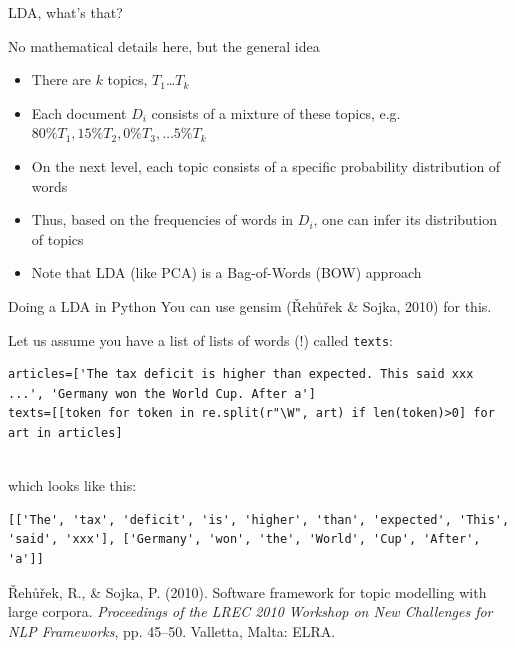 \documentclass[compress]{beamer}
\begin{document}
\begin{frame}{LDA, what's that?}
	\begin{block}{No mathematical details here, but the general idea}
		\begin{itemize}
			\item There are $k$ topics, $T_1$\ldots$T_k$
			\item Each document $D_i$ consists of a mixture of these topics, e.g.$80\% T_1, 15\% T_2, 0\% T_3, \ldots 5\% T_k $
			\item On the next level, each topic consists of a specific probability distribution of words
			\item Thus, based on the frequencies of words in $D_i$, one can infer its distribution of topics
			\item Note that LDA (like PCA) is a Bag-of-Words (BOW) approach
		\end{itemize}
	\end{block}
	
\end{frame}




\begin{frame}[fragile]{Doing a LDA in Python}
You can use gensim ({\v R}eh{\r u}{\v r}ek \& Sojka, 2010) for this.

Let us assume you have a list of lists of words (!) called \texttt{texts}:

\begin{lstlisting}
articles=['The tax deficit is higher than expected. This said xxx ...', 'Germany won the World Cup. After a']
texts=[[token for token in re.split(r"\W", art) if len(token)>0] for art in articles]


\end{lstlisting}
which looks like this:
\begin{lstlisting}
[['The', 'tax', 'deficit', 'is', 'higher', 'than', 'expected', 'This', 'said', 'xxx'], ['Germany', 'won', 'the', 'World', 'Cup', 'After', 'a']]
\end{lstlisting}

\tiny{{\v R}eh{\r u}{\v r}ek, R., \& Sojka, P. (2010). Software framework for topic modelling with large corpora. \emph{Proceedings of the LREC 2010 Workshop on New Challenges for NLP Frameworks}, pp. 45–50. Valletta, Malta: ELRA. }

\end{frame}
\end{document}
